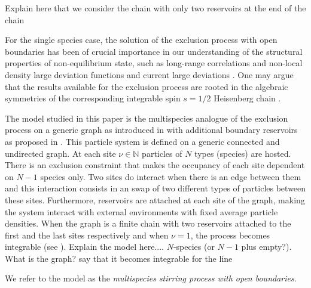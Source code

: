 \documentclass[10pt]{article}
\numberwithin{equation}{section}
\numberwithin{equation}{subsection}
\begin{document}
{\color{red} Explain here that we consider the chain with only two reservoirs at the end of the chain}

For the single species case,  the solution of the exclusion process with open boundaries \cite{derrida1993exact,1993JSP....72..277S} has been of crucial importance in our understanding of the structural properties of non-equilibrium state, such as long-range correlations \cite{spohn1983long} and non-local density large deviation functions \cite{derrida2007non,derrida1998exact} and current large deviations \cite{mallick2022exact,bodineau2005current}. One may argue that the results available for the exclusion process are rooted in the algebraic symmetries of the corresponding integrable spin $s=1/2$ Heisenberg chain \cite{schutzManyBody,SSEPReviewRagoucy}.


The model studied in this paper is the multispecies analogue of the exclusion process on a generic graph as introduced in \cite{zhou2021orthogonal} with additional boundary reservoirs as proposed in \cite{vanicat2017exact}. {\color{blue}This particle system is defined on a generic connected and undirected graph. At each site $\nu\in \mathbb{N}$ particles of $N$ types (species) are hosted. There is an exclusion constraint that makes the occupancy of each site dependent on $N-1$ species only. Two sites do interact when there is an edge between them and this interaction consists in an swap of two different types of particles between these sites. Furthermore, reservoirs are attached at each site of the graph, making the system interact with external environments with fixed average particle densities. When the graph is a finite chain with two reservoirs attached to the first and the last sites respectively and when $\nu=1$, the process becomes integrable (see \cite{vanicat2017exact}).}
{\color{red}Explain the model here.... $N$-species (or $N-1$ plus empty?). What is the graph? say that it becomes integrable for the line }

We refer to the model as the {\em  multispecies stirring process with open boundaries}.
%

\end{document}
